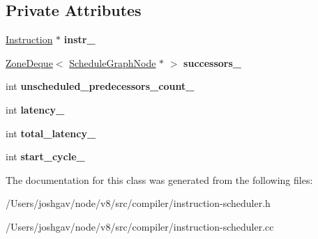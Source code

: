 \subsection*{Private Attributes}
\begin{DoxyCompactItemize}
\item 
\hyperlink{classv8_1_1internal_1_1compiler_1_1_instruction}{Instruction} $\ast$ {\bfseries instr\+\_\+}\hypertarget{classv8_1_1internal_1_1compiler_1_1_instruction_scheduler_1_1_schedule_graph_node_afbb644517dd024c93947ed7a0dc31c50}{}\label{classv8_1_1internal_1_1compiler_1_1_instruction_scheduler_1_1_schedule_graph_node_afbb644517dd024c93947ed7a0dc31c50}

\item 
\hyperlink{classv8_1_1internal_1_1_zone_deque}{Zone\+Deque}$<$ \hyperlink{classv8_1_1internal_1_1compiler_1_1_instruction_scheduler_1_1_schedule_graph_node}{Schedule\+Graph\+Node} $\ast$ $>$ {\bfseries successors\+\_\+}\hypertarget{classv8_1_1internal_1_1compiler_1_1_instruction_scheduler_1_1_schedule_graph_node_ac266db2a56a19d6fba55abf64a9b51c7}{}\label{classv8_1_1internal_1_1compiler_1_1_instruction_scheduler_1_1_schedule_graph_node_ac266db2a56a19d6fba55abf64a9b51c7}

\item 
int {\bfseries unscheduled\+\_\+predecessors\+\_\+count\+\_\+}\hypertarget{classv8_1_1internal_1_1compiler_1_1_instruction_scheduler_1_1_schedule_graph_node_a7764d88c69994d16d84a1133b421734a}{}\label{classv8_1_1internal_1_1compiler_1_1_instruction_scheduler_1_1_schedule_graph_node_a7764d88c69994d16d84a1133b421734a}

\item 
int {\bfseries latency\+\_\+}\hypertarget{classv8_1_1internal_1_1compiler_1_1_instruction_scheduler_1_1_schedule_graph_node_a37af7fe00072409f4ea528c5181ab2eb}{}\label{classv8_1_1internal_1_1compiler_1_1_instruction_scheduler_1_1_schedule_graph_node_a37af7fe00072409f4ea528c5181ab2eb}

\item 
int {\bfseries total\+\_\+latency\+\_\+}\hypertarget{classv8_1_1internal_1_1compiler_1_1_instruction_scheduler_1_1_schedule_graph_node_ab5ad5d30c58c4a07e74c3a533716f031}{}\label{classv8_1_1internal_1_1compiler_1_1_instruction_scheduler_1_1_schedule_graph_node_ab5ad5d30c58c4a07e74c3a533716f031}

\item 
int {\bfseries start\+\_\+cycle\+\_\+}\hypertarget{classv8_1_1internal_1_1compiler_1_1_instruction_scheduler_1_1_schedule_graph_node_aed2b919ec15a20e03192e46e4179ebd7}{}\label{classv8_1_1internal_1_1compiler_1_1_instruction_scheduler_1_1_schedule_graph_node_aed2b919ec15a20e03192e46e4179ebd7}

\end{DoxyCompactItemize}


The documentation for this class was generated from the following files\+:\begin{DoxyCompactItemize}
\item 
/\+Users/joshgav/node/v8/src/compiler/instruction-\/scheduler.\+h\item 
/\+Users/joshgav/node/v8/src/compiler/instruction-\/scheduler.\+cc\end{DoxyCompactItemize}
